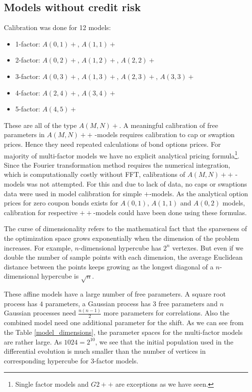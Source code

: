 \subsection{Models without credit risk}

Calibration was done for 12 models:
	\begin{itemize}
		\item 1-factor: $A(0,1)+$, $A(1,1)+$
		\item 2-factor: $A(0,2)+$, $A(1,2)+$, $A(2,2)+$
		\item 3-factor: $A(0,3)+$, $A(1,3)+$, $A(2,3)+$, $A(3,3)+$
		\item 4-factor: $A(2,4)+$, $A(3,4)+$
		\item 5-factor: $A(4,5)+$
	\end{itemize}
These are all of the type $A(M,N)+$. A meaningful calibration of free parameters in $A(M,N)++$ -models requires calibration to cap or swaption prices. Hence they need repeated calculations of bond options prices. For majority of multi-factor models we have no explicit analytical pricing formula\footnote{Single factor models and $G2++$ are exceptions as we have seen.}. Since the Fourier transformation method requires the numerical integration, which is computationally costly without FFT, calibrations of $A(M,N)++$ -models was not attempted. For this and due to lack of data, no caps or swaptions data were used in model calibration for simple $+$-models. As the analytical option prices for zero coupon bonds exists for $A(0,1)$, $A(1,1)$ and $A(0,2)$ models, calibration for respective $++$-models could have been done using these formulas.

The curse of dimensionality refers to the mathematical fact that the sparseness of the optimization space grows exponentially when the dimension of the problem increases. For example, $n$-dimensional hypercube has $2^n$ vertexes. But even if we double the number of sample points with each dimension, the average Euclidean distance between the points keeps growing as the longest diagonal of a $n$-dimensional hypercube is $\sqrt{n}$. 

These affine models have a large number of free parameters. A square root process has $4$ parameters, a Gaussian process has 3 free parameters and $n$ Gaussian processes need $\frac{n(n-1)}{2}$ more parameters for correlations. Also the combined model need one additional parameter for the shift. As we can see from the Table \ref{model_dimensions}, the parameter spaces for the multi-factor models are rather large. As $1024 = 2^{10}$, we see that the initial population used in the differential evolution is much smaller than the number of vertices in corresponding hypercube for $3$-factor models. 

